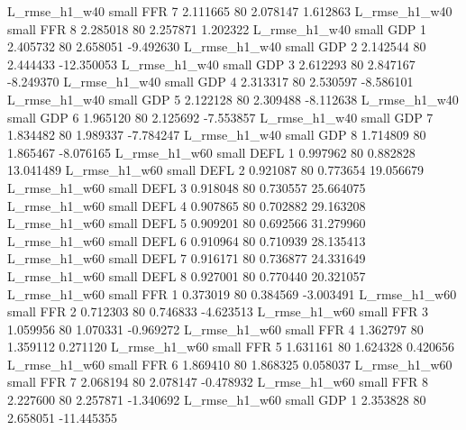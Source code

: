  L_rmse_h1_w40      small      FFR                 7 2.111665 80       2.078147           1.612863
 L_rmse_h1_w40      small      FFR                 8 2.285018 80       2.257871           1.202322
 L_rmse_h1_w40      small      GDP                 1 2.405732 80       2.658051          -9.492630
 L_rmse_h1_w40      small      GDP                 2 2.142544 80       2.444433         -12.350053
 L_rmse_h1_w40      small      GDP                 3 2.612293 80       2.847167          -8.249370
 L_rmse_h1_w40      small      GDP                 4 2.313317 80       2.530597          -8.586101
 L_rmse_h1_w40      small      GDP                 5 2.122128 80       2.309488          -8.112638
 L_rmse_h1_w40      small      GDP                 6 1.965120 80       2.125692          -7.553857
 L_rmse_h1_w40      small      GDP                 7 1.834482 80       1.989337          -7.784247
 L_rmse_h1_w40      small      GDP                 8 1.714809 80       1.865467          -8.076165
 L_rmse_h1_w60      small     DEFL                 1 0.997962 80       0.882828          13.041489
 L_rmse_h1_w60      small     DEFL                 2 0.921087 80       0.773654          19.056679
 L_rmse_h1_w60      small     DEFL                 3 0.918048 80       0.730557          25.664075
 L_rmse_h1_w60      small     DEFL                 4 0.907865 80       0.702882          29.163208
 L_rmse_h1_w60      small     DEFL                 5 0.909201 80       0.692566          31.279960
 L_rmse_h1_w60      small     DEFL                 6 0.910964 80       0.710939          28.135413
 L_rmse_h1_w60      small     DEFL                 7 0.916171 80       0.736877          24.331649
 L_rmse_h1_w60      small     DEFL                 8 0.927001 80       0.770440          20.321057
 L_rmse_h1_w60      small      FFR                 1 0.373019 80       0.384569          -3.003491
 L_rmse_h1_w60      small      FFR                 2 0.712303 80       0.746833          -4.623513
 L_rmse_h1_w60      small      FFR                 3 1.059956 80       1.070331          -0.969272
 L_rmse_h1_w60      small      FFR                 4 1.362797 80       1.359112           0.271120
 L_rmse_h1_w60      small      FFR                 5 1.631161 80       1.624328           0.420656
 L_rmse_h1_w60      small      FFR                 6 1.869410 80       1.868325           0.058037
 L_rmse_h1_w60      small      FFR                 7 2.068194 80       2.078147          -0.478932
 L_rmse_h1_w60      small      FFR                 8 2.227600 80       2.257871          -1.340692
 L_rmse_h1_w60      small      GDP                 1 2.353828 80       2.658051         -11.445355
